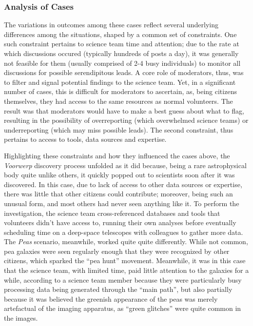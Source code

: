 \documentclass{sigchi}
\begin{document}
\subsubsection{Analysis of Cases}

The variations in outcomes among these cases reflect several underlying differences among the situations, shaped by a common set of constraints.  One such constraint pertains to science team time and attention; due to the rate at which discussions occured (typically hundreds of posts a day), it was generally not feasible for them (usually comprised of 2-4 busy individuals) to monitor all discussions for possible serendipitous leads.  A core role of moderators, thus, was to filter and signal potential findings to the science team.  Yet, in a significant number of cases, this is difficult for moderators to ascertain, as, being citizens themselves, they had access to the same resources as normal volunteers. The result was that moderators would have to make a best guess about what to flag, resulting in the possibility of overreporting (which overwhelmed science teams) or underreporting (which may miss possible leads).  The second constraint, thus pertains to access to tools, data sources and expertise. 

Highlighting these constraints and how they influenced the cases above, the \emph{Voorwerp} discovery process unfolded as it did because, being a rare astrophysical body quite unlike others, it quickly popped out to scientists soon after it was discovered.  In this case, due to lack of access to other data sources or expertise, there was little that other citizens could contribute; moreover, being such an unusual form, and most others had never seen anything like it. To perform the investigation, the science team cross-referenced databases and tools that volunteers didn't have access to, running their own analyses before eventually scheduling time on a deep-space telescopes with colleagues to gather more data.  The \emph{Peas} scenario, meanwhile, worked quite quite differently.  While not common, pea galaxies were seen regularly enough that they were recognized by other citizens, which sparked the ``pea hunt'' movement. Meanwhile, it was in this case that the science team, with limited time, paid little attention to the galaxies for a while, according to a science team member because they were particularly busy processing data being generated through the ``main path'', but also partially because it was believed the greenish appearance of the peas was merely artefactual of the imaging apparatus, as ``green glitches'' were quite common in the images. 
\end{document}
